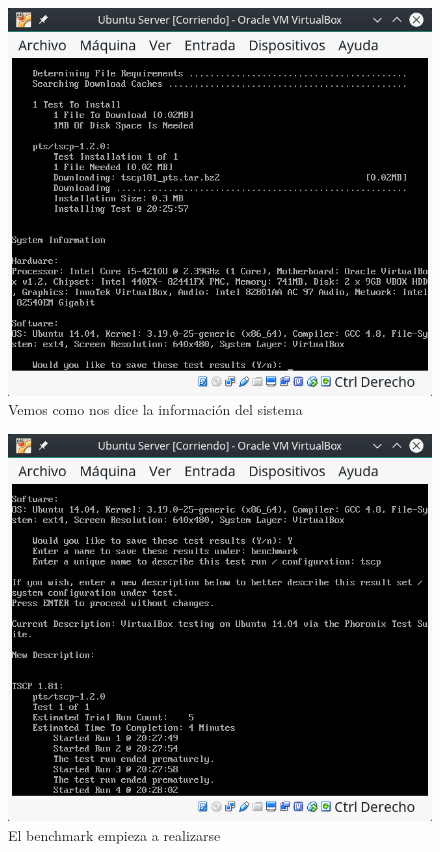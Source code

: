 \begin{figure}[H] %
	\centering
	\includegraphics[scale=0.5]{figuras/figura19.png}  %
	
	
	\caption{Vemos como nos dice la información del sistema}
	\label{figura19}
\end{figure}
\begin{figure}[H] %
	\centering
	\includegraphics[scale=0.5]{figuras/figura20.png}  %
	
	
	\caption{El benchmark empieza a realizarse}
	\label{figura20}
\end{figure}

